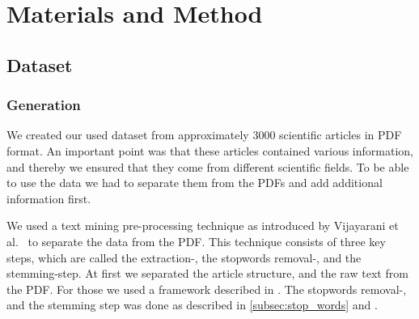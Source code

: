 \chapter{Materials and Method}
\label{cha:materials_and_method}

\section{Dataset}
\label{sec:dataset}

\subsection{Generation}
\label{subsec:generation}

We created our used dataset from approximately 3000 scientific articles in PDF format. An important point was that these articles contained various information, and thereby we ensured that they come from different scientific fields. To be able to use the data we had to separate them from the PDFs and add additional information first.

We used a text mining pre-processing technique as introduced by Vijayarani et al.~\cite{Vijayarani2015} to separate the data from the PDF. This technique consists of three key steps, which are called the extraction-, the stopwords removal-, and the stemming-step. At first we separated the article structure, and the raw text from the PDF. For those we used a framework described in . The stopwords removal-, and the stemming step was done as described in \cref{subsec:stop_words} and .

